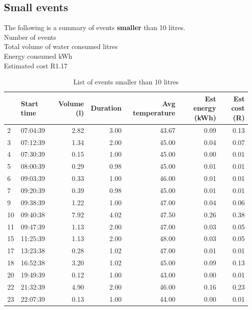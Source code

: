 \documentclass{article}\usepackage[]{graphicx}\usepackage[]{color}
\newenvironment{knitrout}{}{} %
\begin{document}
\subsection{Small events}

The following is a summary of events \textbf{smaller} than 10 litres. \\

Number of events \\
Total volume of water consumed  litres\\
Energy consumed  kWh\\
Estimated cost \dotfill R1.17\\

\begin{center}
\begin{table}[h!]
\begin{knitrout}
\color{fgcolor}
\begin{tabular}{l|l|r|r|r|r|r}
\hline
  & Start time & Volume (l) & Duration & Avg temperature & Est energy (kWh) & Est cost (R)\\
\hline
2 & 07:04:39 & 2.82 & 3.00 & 43.67 & 0.09 & 0.13\\
\hline
3 & 07:12:39 & 1.34 & 2.00 & 45.00 & 0.04 & 0.07\\
\hline
4 & 07:30:39 & 0.15 & 1.00 & 45.00 & 0.00 & 0.01\\
\hline
5 & 08:00:39 & 0.29 & 0.98 & 45.00 & 0.01 & 0.01\\
\hline
6 & 09:03:39 & 0.33 & 1.00 & 46.00 & 0.01 & 0.01\\
\hline
7 & 09:20:39 & 0.39 & 0.98 & 45.00 & 0.01 & 0.01\\
\hline
9 & 09:38:39 & 1.22 & 1.00 & 47.00 & 0.04 & 0.06\\
\hline
10 & 09:40:38 & 7.92 & 4.02 & 47.50 & 0.26 & 0.38\\
\hline
11 & 09:47:39 & 1.13 & 2.00 & 47.00 & 0.03 & 0.05\\
\hline
15 & 11:25:39 & 1.13 & 2.00 & 48.00 & 0.03 & 0.05\\
\hline
17 & 13:23:38 & 0.28 & 1.02 & 47.00 & 0.01 & 0.01\\
\hline
18 & 16:52:38 & 3.20 & 1.02 & 45.00 & 0.09 & 0.13\\
\hline
20 & 19:49:39 & 0.12 & 1.00 & 43.00 & 0.00 & 0.01\\
\hline
22 & 21:32:39 & 4.90 & 2.00 & 46.00 & 0.16 & 0.23\\
\hline
23 & 22:07:39 & 0.13 & 1.00 & 44.00 & 0.00 & 0.01\\
\hline
\end{tabular}


\end{knitrout}
\caption{List of events smaller than 10 litres}
\end{table}
\end{center}
\end{document}
